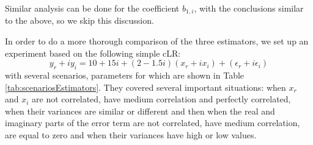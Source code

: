 \documentclass[
]{book}
\begin{document}
Similar analysis can be done for the coefficient \(b_{1,i}\), with the conclusions similar to the above, so we skip this discussion.

In order to do a more thorough comparison of the three estimators, we set up an experiment based on the following simple cLR:
\begin{equation*}
    y_r + i y_i = 10+15i + (2-1.5i) (x_r + i x_i) + (\epsilon_r + i \epsilon_i)
\end{equation*}
with several scenarios, parameters for which are shown in Table \ref{tab:scenariosEstimators}. They covered several important situations: when \(x_r\) and \(x_i\) are not correlated, have medium correlation and perfectly correlated, when their variances are similar or different and then when the real and imaginary parts of the error term are not correlated, have medium correlation, are equal to zero and when their variances have high or low values.

\begin{table}

\caption{\label{tab:scenariosEstimators}Several scenarios for the comparison of estimators.}
\centering
{}
\end{table}
\end{document}
